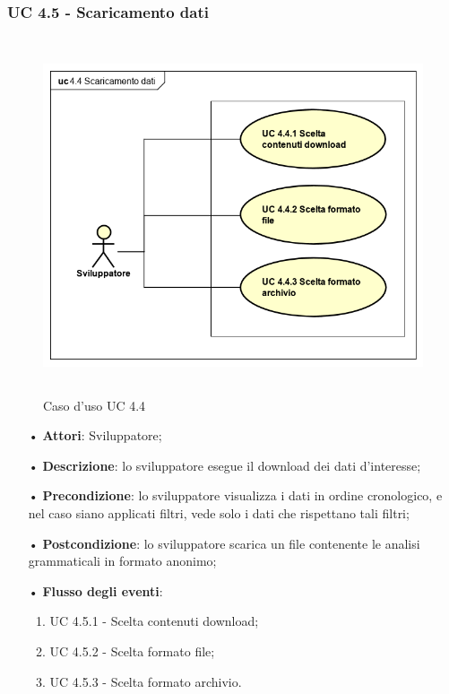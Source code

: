 \subsubsection{UC 4.5 - Scaricamento dati}
\begin{figure}[H]
	\centering
	\includegraphics[width=17cm, height=10.5cm]{img/UC440.png} 
	\caption{Caso d'uso UC 4.4}\label{fig:450}
\end{figure}
\begin{itemize}
	\item[•]\textbf{Attori}: Sviluppatore;
	\item[•]\textbf{Descrizione}: lo sviluppatore esegue il download dei dati d'interesse;
	\item[•]\textbf{Precondizione}: lo sviluppatore visualizza i dati in ordine cronologico, e nel caso siano applicati filtri, vede solo i dati che rispettano tali filtri;
	\item[•]\textbf{Postcondizione}: lo sviluppatore scarica un file contenente le analisi grammaticali in formato anonimo;
	\item[•]\textbf{Flusso degli eventi}:
	\begin{enumerate}
		\item UC 4.5.1 - Scelta contenuti download;
		\item UC 4.5.2 - Scelta formato file;
		\item UC 4.5.3 - Scelta formato archivio.
	\end{enumerate}
\end{itemize}

